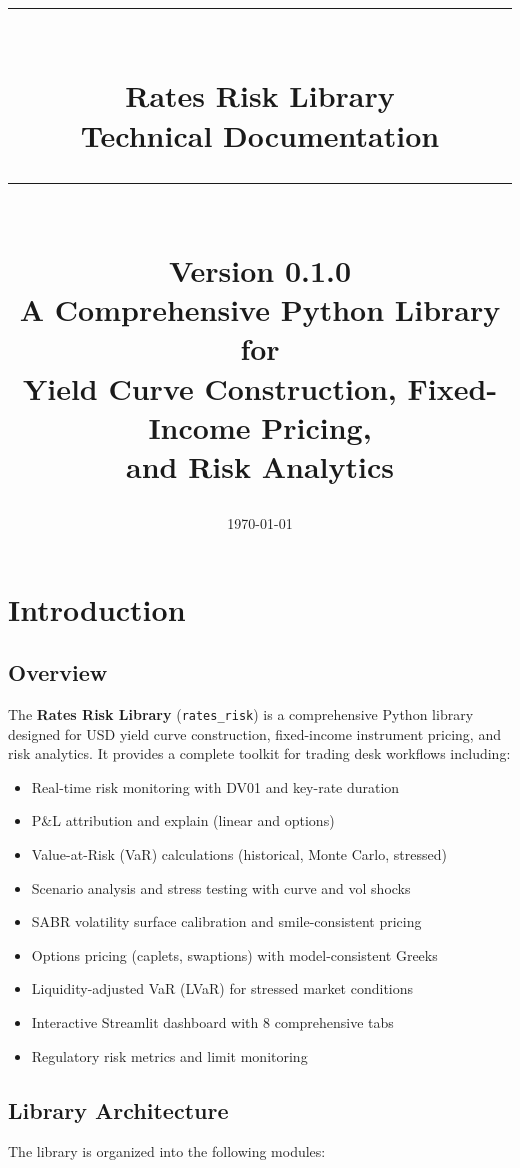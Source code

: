 \documentclass[12pt,a4paper]{report}
\title{
    \vspace{-2cm}
    \rule{\linewidth}{0.5mm} \\[0.4cm]
    {\Huge \bfseries Rates Risk Library} \\[0.3cm]
    {\Large Technical Documentation} \\[0.2cm]
    \rule{\linewidth}{0.5mm} \\[1cm]
    {\large Version 0.1.0} \\[0.5cm]
    {\large A Comprehensive Python Library for\\
    Yield Curve Construction, Fixed-Income Pricing,\\
    and Risk Analytics}
}
\author{}
\date{\today}
\newcommand{\code}[1]{\texttt{#1}}
\begin{document}
\maketitle
\thispagestyle{empty}

\tableofcontents
\newpage

\chapter{Introduction}

\section{Overview}

The \textbf{Rates Risk Library} (\code{rates_risk}) is a comprehensive Python library designed for USD yield curve construction, fixed-income instrument pricing, and risk analytics. It provides a complete toolkit for trading desk workflows including:

\begin{itemize}
    \item Real-time risk monitoring with DV01 and key-rate duration
    \item P\&L attribution and explain (linear and options)
    \item Value-at-Risk (VaR) calculations (historical, Monte Carlo, stressed)
    \item Scenario analysis and stress testing with curve and vol shocks
    \item SABR volatility surface calibration and smile-consistent pricing
    \item Options pricing (caplets, swaptions) with model-consistent Greeks
    \item Liquidity-adjusted VaR (LVaR) for stressed market conditions
    \item Interactive Streamlit dashboard with 8 comprehensive tabs
    \item Regulatory risk metrics and limit monitoring
\end{itemize}

\section{Library Architecture}

The library is organized into the following modules:
\end{document}
